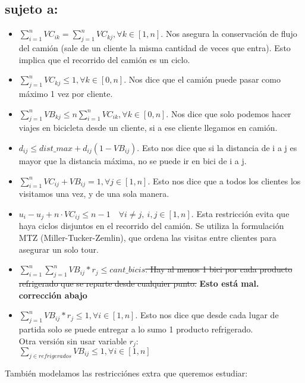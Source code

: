 \documentclass[11pt,a4paper]{article}
\begin{document}
\subsection{sujeto a:}
\begin{itemize}
    \item $\sum_{i=1}^{n} VC_{ik} = \sum_{j=1}^{n} VC_{kj}, \forall k\in[1,n]$. Nos asegura la conservación de flujo del camión (sale de un cliente la misma cantidad de veces que entra). Esto implica que el recorrido del camión es un ciclo.
    \item $\sum_{j=1}^{n} VC_{kj} \leq 1, \forall k \in [0,n]$. Nos dice que el camión puede pasar como máximo 1 vez por cliente.
    \item $\sum_{j=1}^{n} VB_{kj} \leq n\sum_{i=1}^{n} VC_{ik}, \forall k \in [0,n]$. Nos dice que solo podemos hacer viajes en bicicleta desde un cliente, si a ese cliente llegamos en camión.
    \item $d_{ij} \leq dist\_max + d_{ij}(1-VB_{ij})$. Esto nos dice que si la distancia de i a j es mayor que la distancia máxima, no se puede ir en bici de i a j.
    \item $\sum_{i=1}^{n} VC_{ij} + VB_{ij} = 1, \forall j \in [1,n]$. Esto nos dice que a todos los clientes los visitamos una vez, y de una sola manera.
 \item $u_i - u_j + n \cdot VC_{ij} \leq n - 1 \quad \forall i \ne j,\ i,j \in [1, n]$. 
Esta restricción evita que haya ciclos disjuntos en el recorrido del camión. Se utiliza la formulación MTZ (Miller-Tucker-Zemlin), que ordena las visitas entre clientes para asegurar un solo tour.

    \item \st{$\sum_{i=1}^{n}\sum_{j=1}^{n} VB_{ij} * r_j \leq cant\_bicis $. Hay al menos 1 bici por cada producto refrigerado que se reparte desde cualquier punto.} \textbf{Esto está mal. corrección abajo}
    \item $\sum_{j=1}^{n} VB_{ij} * r_j \leq 1, \forall i \in [1,n]$. Esto nos dice que desde cada lugar de partida solo se puede entregar a lo sumo 1 producto refrigerado.\\
    Otra versión sin usar variable $r_j$:\\
    $\sum_{j \in refrigerados} VB_{ij} \leq 1, \forall i \in [1,n]$
\end{itemize}
\vspace{0.5cm}
{También modelamos las restricciónes extra que queremos estudiar:\\}
\end{document}
